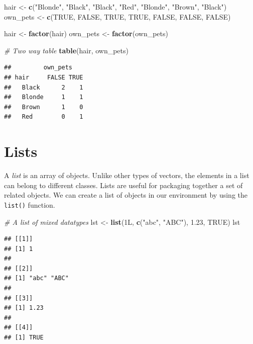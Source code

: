 \documentclass[
]{book}
\newenvironment{Shaded}{\begin{snugshade}}{\end{snugshade}}
\newcommand{\CommentTok}[1]{\textcolor[rgb]{0.56,0.35,0.01}{\textit{#1}}}
\newcommand{\FloatTok}[1]{\textcolor[rgb]{0.00,0.00,0.81}{#1}}
\newcommand{\KeywordTok}[1]{\textcolor[rgb]{0.13,0.29,0.53}{\textbf{#1}}}
\newcommand{\NormalTok}[1]{#1}
\newcommand{\OtherTok}[1]{\textcolor[rgb]{0.56,0.35,0.01}{#1}}
\newcommand{\StringTok}[1]{\textcolor[rgb]{0.31,0.60,0.02}{#1}}
\begin{document}
\begin{Shaded}
\begin{Highlighting}[]
\NormalTok{hair <-}\StringTok{ }\KeywordTok{c}\NormalTok{(}\StringTok{"Blonde"}\NormalTok{, }\StringTok{"Black"}\NormalTok{, }\StringTok{"Black"}\NormalTok{, }\StringTok{"Red"}\NormalTok{, }\StringTok{"Blonde"}\NormalTok{, }\StringTok{"Brown"}\NormalTok{,}
    \StringTok{"Black"}\NormalTok{)}
\NormalTok{own_pets <-}\StringTok{ }\KeywordTok{c}\NormalTok{(}\OtherTok{TRUE}\NormalTok{, }\OtherTok{FALSE}\NormalTok{, }\OtherTok{TRUE}\NormalTok{, }\OtherTok{TRUE}\NormalTok{, }\OtherTok{FALSE}\NormalTok{, }\OtherTok{FALSE}\NormalTok{, }\OtherTok{FALSE}\NormalTok{)}

\NormalTok{hair <-}\StringTok{ }\KeywordTok{factor}\NormalTok{(hair)}
\NormalTok{own_pets <-}\StringTok{ }\KeywordTok{factor}\NormalTok{(own_pets)}


\CommentTok{# Two way table}
\KeywordTok{table}\NormalTok{(hair, own_pets)}
\end{Highlighting}
\end{Shaded}

\begin{verbatim}
##         own_pets
## hair     FALSE TRUE
##   Black      2    1
##   Blonde     1    1
##   Brown      1    0
##   Red        0    1
\end{verbatim}

\hypertarget{lists}{%
\section{Lists}\label{lists}}

A \emph{list} is an array of objects. Unlike other types of vectors, the elements in a list can belong to different classes. Lists are useful for packaging together a set of related objects. We can create a list of objects in our environment by using the \texttt{list()} function.

\begin{Shaded}
\begin{Highlighting}[]
\CommentTok{# A list of mixed datatypes}
\NormalTok{lst <-}\StringTok{ }\KeywordTok{list}\NormalTok{(1L, }\KeywordTok{c}\NormalTok{(}\StringTok{"abc"}\NormalTok{, }\StringTok{"ABC"}\NormalTok{), }\FloatTok{1.23}\NormalTok{, }\OtherTok{TRUE}\NormalTok{)}
\NormalTok{lst}
\end{Highlighting}
\end{Shaded}

\begin{verbatim}
## [[1]]
## [1] 1
## 
## [[2]]
## [1] "abc" "ABC"
## 
## [[3]]
## [1] 1.23
## 
## [[4]]
## [1] TRUE
\end{verbatim}
\end{document}
